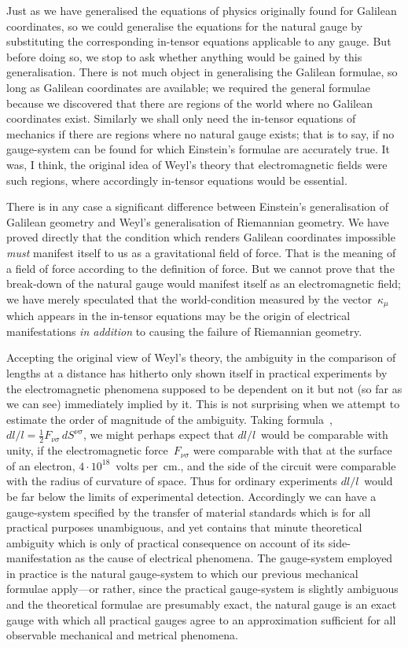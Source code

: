 \documentclass[12pt]{book}
\begin{document}
Just as we have generalised the equations of physics originally found for
Galilean coordinates, so we could generalise the equations for the natural
gauge by substituting the corresponding in\hyp{}tensor equations applicable to
any gauge. But before doing so, we stop to ask whether anything would be
gained by this generalisation. There is not much object in generalising the
Galilean formulae, so long as Galilean coordinates are available; we required
the general formulae because we discovered that there are regions of the
world where no Galilean coordinates exist. Similarly we shall only need the
in\hyp{}tensor equations of mechanics if there are regions where no natural
gauge exists; that is to say, if no gauge\hyp{}system can be found for which
Einstein's formulae are accurately true. It was, I think, the original idea of
Weyl's theory that electromagnetic fields were such regions, where accordingly
in\hyp{}tensor equations would be essential.

There is in any case a significant difference between Einstein's generalisation
of Galilean geometry and Weyl's generalisation of Riemannian
geometry. We have proved directly that the condition which renders Galilean
coordinates impossible \emph{must} manifest itself to us as a gravitational field of
force. That is the meaning of a field of force according to the definition of force.
But we cannot prove that the break\hyp{}down of the natural gauge would manifest
itself as an electromagnetic field; we have merely speculated that the world\hyp{}condition
measured by the vector~$\kappa_{\mu}$ which appears in the in\hyp{}tensor equations
may be the origin of electrical manifestations \emph{in addition} to causing the
failure of Riemannian geometry.

Accepting the original view of Weyl's theory, the ambiguity in the
comparison of lengths at a distance has hitherto only shown itself in practical
experiments by the electromagnetic phenomena supposed to be dependent on
it but not (so far as we can see) immediately implied by it. This is not
surprising when we attempt to estimate the order of magnitude of the
ambiguity. Taking formula~, $dl/l = \frac{1}{2} F_{\nu\sigma}\, dS^{\nu\sigma}$, we might perhaps expect
that $dl/l$~would be comparable with unity, if the electromagnetic force~$F_{\nu\sigma}$
were comparable with that at the surface of an electron, $4 \cdot 10^{18}$~volts per~cm.,
and the side of the circuit were comparable with the radius of curvature of
space. Thus for ordinary experiments $dl/l$~would be far below the limits of
experimental detection. Accordingly we can have a gauge\hyp{}system specified
by the transfer of material standards which is for all practical purposes
unambiguous, and yet contains that minute theoretical ambiguity which is
only of practical consequence on account of its side\hyp{}manifestation as the
cause of electrical phenomena. The gauge\hyp{}system employed in practice is
the natural gauge\hyp{}system to which our previous mechanical formulae apply---or
rather, since the practical gauge\hyp{}system is slightly ambiguous and the
theoretical formulae are presumably exact, the natural gauge is an exact
gauge with which all practical gauges agree to an approximation sufficient
for all observable mechanical and metrical phenomena.
\end{document}
